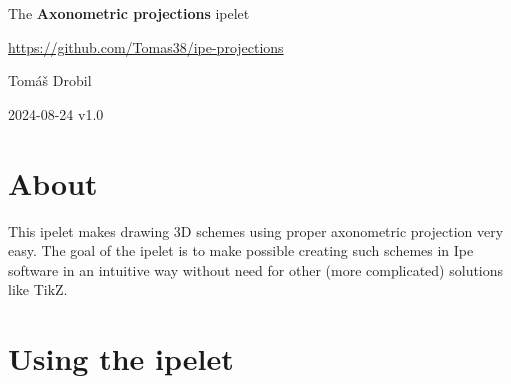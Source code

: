 \documentclass[11pt,a4paper]{article}
\begin{document}
%        
%        
%            
%            
%            
%        
%            
%            
%            
%            

\begin{center}        
\vspace*{0.5cm}
\huge
The \textbf{Axonometric projections} ipelet

\vspace{0.25cm}

\large
\url{https://github.com/Tomas38/ipe-projections}

\vspace{0.25cm}

\Large
Tomáš Drobil

\large
2024-08-24 v1.0
\vspace{1cm}
\end{center}

\tableofcontents

\listoffigures

\newpage

\section*{About}

This ipelet makes drawing 3D schemes using proper axonometric projection very easy. The goal of the ipelet is to make possible creating such schemes in Ipe software in an intuitive way without need for other (more complicated) solutions like TikZ.

\section{Using the ipelet}
\end{document}
